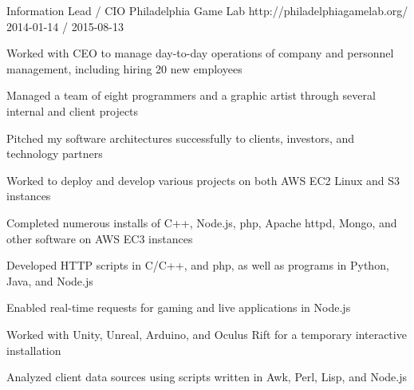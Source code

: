 \documentclass[11pt, a4paper]{awesome-cv}
\begin{document}
\begin{cventries}
  \cventry
    {Information Lead / CIO}
    {Philadelphia Game Lab}
    {http://philadelphiagamelab.org/}
    {2014-01-14 / 2015-08-13}
    {
          \begin{cvitems}
                \item{Worked with CEO to manage day-to-day operations of company and personnel management, including hiring 20 new employees}
                \item{Managed a team of eight programmers and a graphic artist through several internal and client projects}
                \item{Pitched my software architectures successfully to clients, investors, and technology partners}
                \item{Worked to deploy and develop various projects on both AWS EC2 Linux and S3 instances}
                    \begin{cvitemssub}
                        \item{Completed numerous installs of C++, Node.js, php, Apache httpd, Mongo, and other software on AWS EC3 instances}
                        \item{Developed HTTP scripts in C/C++, and php, as well as programs in Python, Java, and Node.js}
                        \item{Enabled real-time requests for gaming and live applications in Node.js}
                    \end{cvitemssub}
                \item{Worked with Unity, Unreal, Arduino, and Oculus Rift for a temporary interactive installation}
                \item{Analyzed client data sources using scripts written in Awk, Perl, Lisp, and Node.js}
          \end{cvitems}
    }
 

\end{cventries}
\end{document}
